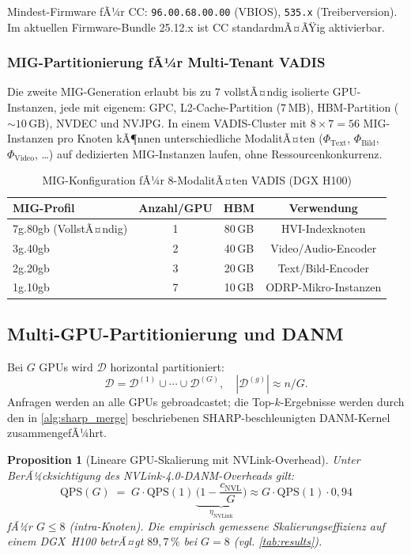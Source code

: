 ﻿\documentclass[12pt,a4paper]{article}
\newtheorem{proposition}[theorem]{Proposition}
\begin{document}
Mindest-Firmware fÃ¼r CC: \texttt{96.00.68.00.00} (VBIOS),
\texttt{535.x} (Treiberversion). Im aktuellen
Firmware-Bundle 25.12.x ist CC standardmÃ¤ÃŸig aktivierbar.

\subsubsection{MIG-Partitionierung fÃ¼r Multi-Tenant VADIS}

Die zweite MIG-Generation erlaubt bis zu $7$ vollstÃ¤ndig
isolierte GPU-Instanzen, jede mit eigenem:
GPC, L2-Cache-Partition ($7\,\text{MB}$), HBM-Partition
($\sim 10\,\text{GB}$), NVDEC und NVJPG. In einem
VADIS-Cluster mit $8 \times 7 = 56$ MIG-Instanzen pro Knoten
kÃ¶nnen unterschiedliche ModalitÃ¤ten ($\Phi_{\text{Text}}$,
$\Phi_{\text{Bild}}$, $\Phi_{\text{Video}}$, \ldots) auf
dedizierten MIG-Instanzen laufen, ohne Ressourcenkonkurrenz.

\begin{table}[ht]
\centering
\small
\caption{MIG-Konfiguration fÃ¼r 8-ModalitÃ¤ten VADIS (DGX H100)}
\label{tab:mig}
\begin{tabular}{@{}lccc@{}}
\toprule
\textbf{MIG-Profil} & \textbf{Anzahl/GPU} & \textbf{HBM} & \textbf{Verwendung} \\
\midrule
7g.80gb (VollstÃ¤ndig) & 1 & 80\,GB & HVI-Indexknoten \\
3g.40gb & 2 & 40\,GB & Video/Audio-Encoder \\
2g.20gb & 3 & 20\,GB & Text/Bild-Encoder \\
1g.10gb & 7 & 10\,GB & ODRP-Mikro-Instanzen \\
\bottomrule
\end{tabular}
\end{table}

\subsection{Multi-GPU-Partitionierung und DANM}
\label{sub:multigpu}

Bei $G$ GPUs wird $\mathcal{D}$ horizontal partitioniert:
\[
  \mathcal{D} = \mathcal{D}^{(1)} \cup \cdots \cup \mathcal{D}^{(G)},
  \quad |\mathcal{D}^{(g)}| \approx n/G.
\]
Anfragen werden an alle GPUs gebroadcastet; die Top-$k$-Ergebnisse
werden durch den in \cref{alg:sharp_merge} beschriebenen
SHARP-beschleunigten DANM-Kernel zusammengefÃ¼hrt.

\begin{proposition}[Lineare GPU-Skalierung mit NVLink-Overhead]
\label{prop:gpulin}
Unter BerÃ¼cksichtigung des NVLink-4.0-DANM-Overheads gilt:
\[
  \text{QPS}(G) \;=\; G \cdot \text{QPS}(1)\,
  \underbrace{\bigl(1 - \frac{c_{\text{NVL}}}{G}\bigr)}_{\eta_{\text{NVLink}}}
  \approx G \cdot \text{QPS}(1) \cdot 0{,}94
\]
fÃ¼r $G \leq 8$ (intra-Knoten). Die empirisch gemessene
Skalierungseffizienz auf einem DGX~H100 betrÃ¤gt
$89{,}7\,\%$ bei $G=8$ (vgl. \cref{tab:results}).
\end{proposition}
\end{document}
